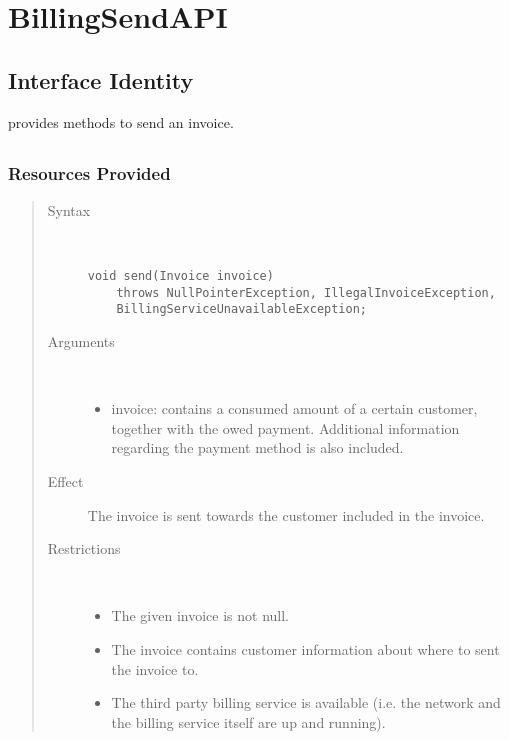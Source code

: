 \section{BillingSendAPI}
\label{api:other-billing-send-api}

\subsection{Interface Identity}

\npar {} provides methods to send an invoice.

\subsection{}

\subsubsection{Resources Provided}

\begin{quote}
	\begin{description}
		\item[Syntax] \ 
		\begin{verbatim}
void send(Invoice invoice)
    throws NullPointerException, IllegalInvoiceException,
    BillingServiceUnavailableException;
		\end{verbatim}
		\item[Arguments] \
		\begin{itemize}
			\item invoice: contains a consumed amount of a certain customer, together
			with the owed payment. Additional information regarding the payment method is
			also included.
		\end{itemize}
		\item[Effect] The invoice is sent towards the customer included in the
		invoice.
		\item[Restrictions] \ 
		\begin{itemize}
			\item The given invoice is not null.
			\item The invoice contains customer information about where to sent the
			invoice to.
			\item The third party billing service is available (i.e. the network and the
			billing service itself are up and running).
		\end{itemize}
	\end{description} 
\end{quote}

